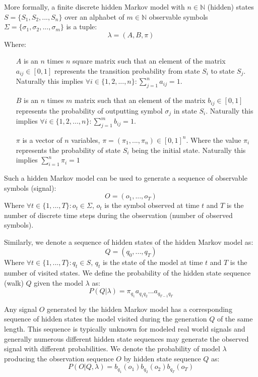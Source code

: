\documentclass[a4paper,12pt]{article}
\begin{document}
More formally, a finite discrete hidden Markov model with $n \in \mathbb{N}$ (hidden) states $S = \{S_1, S_2, ..., S_n\}$ over an alphabet of $m \in \mathbb{N}$ observable symbols $\Sigma=\{\sigma_1, \sigma_2, ..., \sigma_m\}$ is a tuple: $$\lambda = (A, B, \pi)$$
Where:
\begin{itemize}
	\item[$A$] is an $n$ times $n$ square matrix such that an element of the matrix ${a_{ij} \in [0, 1]}$ represents the transition probability from state $S_i$ to state $S_j$. Naturally this implies ${\forall i \in \{1, 2, ..., n\}: \sum_{j=1}^n{a_{ij}} = 1}$.
	\item[$B$] is an $n$ times $m$ matrix such that an element of the matrix ${b_{ij} \in [0, 1]}$ represents the probability of outputting symbol $\sigma_j$ in state $S_i$. Naturally this implies ${\forall i \in \{1, 2, ..., n\}: \sum_{j=1}^m{b_{ij}} = 1}$.
	\item[$\pi$] is a vector of $n$ variables, ${\pi=(\pi_1, ..., \pi_n) \in [0, 1]^n}$. Where the value $\pi_i$ represents the probability of state $S_i$ being the initial state. Naturally this implies ${\sum_{i=1}^n{\pi_i} = 1}$
\end{itemize}

Such a hidden Markov model can be used to generate a sequence of observable symbols (signal): $$O = (o_1, ..., o_T)$$
Where ${\forall t \in \{1, ..., T\}: o_t \in \Sigma}$, $o_t$ is the symbol observed at time $t$ and $T$ is the number of discrete time steps during the observation (number of observed symbols).

Similarly, we denote a sequence of hidden states of the hidden Markov model as: $$Q = (q_0, ..., q_T)$$
Where ${\forall t \in \{1, ..., T\}: q_t \in S}$, $q_t$ is the state of the model at time $t$ and $T$ is the number of visited states.
We define the probability of the hidden state sequence (walk) $Q$ given the model $\lambda$ as:
$$P(Q|\lambda) = \pi_{q_1}a_{q_1q_2}...a_{q_{T-1}q_T}$$

Any signal $O$ generated by the hidden Markov model has a corresponding sequence of hidden states the model visited during the generation $Q$ of the same length. This sequence is typically unknown for modeled real world signals and generally numerous different hidden state sequences may generate the observed signal with different probabilities. We denote the probability of model $\lambda$ producing the observation sequence $O$ by hidden state sequence $Q$ as:
$$P(O|Q,\lambda) = b_{q_1}(o_1)b_{q_2}(o_2)b_{q_T}(o_T)$$
\end{document}
